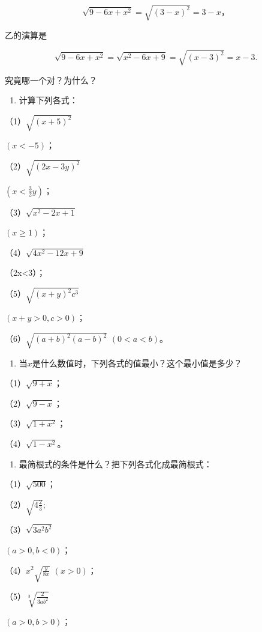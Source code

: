 \[
\sqrt {9 - 6 x + x ^ {2}} = \sqrt {(3 - x) ^ {2}} = 3 - x\text{，}
\]

乙的演算是

\[
\sqrt {9 - 6 x + x ^ {2}} = \sqrt {x ^ {2} - 6 x + 9} = \sqrt {(x - 3) ^ {2}} = x - 3.
\]

究竟哪一个对？为什么？

\begin{enumerate}[start=6]
\item
  计算下列各式：
\end{enumerate}

（1）\(\sqrt{(x + 5)^2}\)

\((x < -5)\)；

（2）\(\sqrt{(2x - 3y)^2}\)

\(\left(x < \frac{3}{2} y\right)\)；

（3）\(\sqrt{x^2 - 2x + 1}\)

\((x \geqslant 1)\)；

（4）\(\sqrt{4x^2 - 12x + 9}\)

（2x\textless3）；

（5）\(\sqrt{(x + y)^2c^3}\)

\((x + y > 0, c > 0)\)；

（6）\(\sqrt{(a + b)^2(a - b)^2}\) \((0 < a < b)\)。

\begin{enumerate}[start=7]
\item
  当\(x\)是什么数值时，下列各式的值最小？这个最小值是多少？
\end{enumerate}

（1）\(\sqrt{9 + x}\)；

（2）\(\sqrt{9 - x}\)；

（3）\(\sqrt{1 + x^2}\)；

（4）\(\sqrt{1 - x^2}\)。

\begin{enumerate}[start=8]
\item
  最简根式的条件是什么？把下列各式化成最简根式：
\end{enumerate}

（1）\(\sqrt{500}\)；

（2）\(\sqrt{4\frac{2}{3}};\)

（3）\(\sqrt{3a^2b^2}\)

\((a > 0, b < 0)\)；

（4）\(x^{2}\sqrt{\frac{y}{8x}}\) \((x > 0)\)；

（5）\(\sqrt[3]{\frac{2}{3ab^2}}\)

\((a > 0, b > 0)\)；

